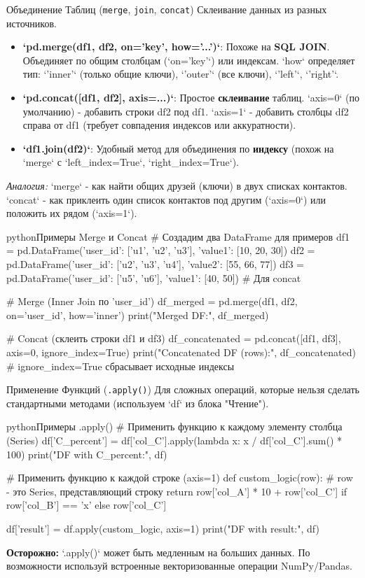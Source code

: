 \begin{myblock}{{Объединение Таблиц (\texttt{merge}, \texttt{join}, \texttt{concat})}}
    Склеивание данных из разных источников.
    \begin{itemize}
        \item \textbf{`pd.merge(df1, df2, on='key', how='...')`}: Похоже на \textbf{SQL JOIN}. Объединяет по общим столбцам (`on='key'`) или индексам. `how` определяет тип: `'inner'` (только общие ключи), `'outer'` (все ключи), `'left'`, `'right'`.
        \item \textbf{`pd.concat([df1, df2], axis=...)`}: Простое \textbf{склеивание} таблиц. `axis=0` (по умолчанию) - добавить строки df2 под df1. `axis=1` - добавить столбцы df2 справа от df1 (требует совпадения индексов или аккуратности).
        \item \textbf{`df1.join(df2)`}: Удобный метод для объединения по \textbf{индексу} (похож на `merge` с `left\_index=True`, `right\_index=True`).
    \end{itemize}
    \textit{Аналогия:} `merge` - как найти общих друзей (ключи) в двух списках контактов. `concat` - как приклеить один список контактов под другим (`axis=0`) или положить их рядом (`axis=1`).
    \begin{codebox}{python}{Примеры Merge и Concat}
    # Создадим два DataFrame для примеров
    df1 = pd.DataFrame({'user_id': ['u1', 'u2', 'u3'], 'value1': [10, 20, 30]})
    df2 = pd.DataFrame({'user_id': ['u2', 'u3', 'u4'], 'value2': [55, 66, 77]})
    df3 = pd.DataFrame({'user_id': ['u5', 'u6'], 'value1': [40, 50]}) # Для concat

    # Merge (Inner Join по 'user_id')
    df_merged = pd.merge(df1, df2, on='user_id', how='inner')
    print("Merged DF:\n", df_merged)

    # Concat (склеить строки df1 и df3)
    df_concatenated = pd.concat([df1, df3], axis=0, ignore_index=True)
    print("Concatenated DF (rows):\n", df_concatenated)
    # ignore_index=True сбрасывает исходные индексы
    \end{codebox}
\end{myblock}

\begin{myblock}{{Применение Функций (\texttt{.apply()})}}
    Для сложных операций, которые нельзя сделать стандартными методами (используем `df` из блока "Чтение").
    \begin{codebox}{python}{Примеры .apply()}
    # Применить функцию к каждому элементу столбца (Series)
    df['C_percent'] = df['col_C'].apply(lambda x: x / df['col_C'].sum() * 100)
    print("DF with C_percent:\n", df)

    # Применить функцию к каждой строке (axis=1)
    def custom_logic(row):
        # row - это Series, представляющий строку
        return row['col_A'] * 10 + row['col_C'] if row['col_B'] == 'x' else row['col_C']

    df['result'] = df.apply(custom_logic, axis=1)
    print("DF with result:\n", df)
    \end{codebox}
    \textbf{Осторожно:} `.apply()` может быть медленным на больших данных. По возможности используй встроенные векторизованные операции NumPy/Pandas.
\end{myblock}

